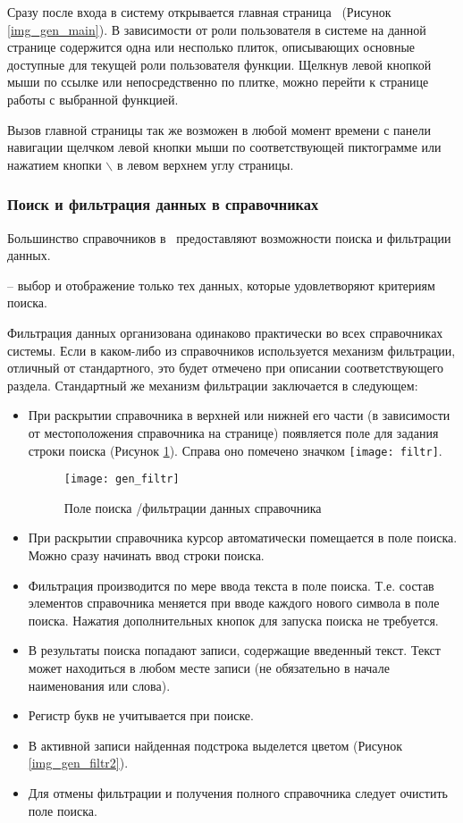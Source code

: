 Сразу после входа в систему открывается главная страница \tmis~(Рисунок \ref{img_gen_main}). В зависимости от роли пользователя в системе на данной странице содержится одна или несполько плиток, описывающих основные доступные для текущей роли пользователя функции. Щелкнув левой кнопкой мыши по ссылке  или непосредственно по плитке, можно перейти к странице работы с выбранной функцией. 

Вызов главной страницы так же возможен в любой момент времени с панели навигации щелчком левой кнопки мыши по соответствующей пиктограмме или нажатием кнопки  $\backslash$  в левом верхнем углу страницы.


\subsubsection{Поиск и фильтрация данных в справочниках} \label{gen_filtr}

Большинство справочников в \tmis~предоставляют возможности поиска и фильтрации данных.

 -- выбор и отображение только тех данных, которые удовлетворяют критериям поиска.

Фильтрация данных организована одинаково практически во всех справочниках системы. Если в каком-либо из справочников используется механизм фильтрации, отличный от стандартного, это будет отмечено при описании соответствующего раздела. Стандартный же механизм фильтрации заключается в следующем:
\begin{itemize}
 \item При раскрытии справочника в верхней или нижней его части (в зависимости от местоположения справочника на странице) появляется поле для задания строки поиска (Рисунок \ref{img_gen_filtr}). Справа оно помечено значком \texttt{[image: filtr]}.
 
 \begin{figure}[!ht]\centering
 	\texttt{[image: gen\_filtr]}
 	\caption{Поле поиска \slash фильтрации данных справочника}
 	\label{img_gen_filtr}
 \end{figure} 
 
 \item При раскрытии справочника курсор автоматически помещается в поле поиска. Можно сразу начинать ввод строки поиска.
 \item Фильтрация производится по мере ввода текста в поле поиска. Т.е. состав элементов справочника меняется при вводе каждого нового символа в поле поиска. Нажатия дополнительных кнопок для запуска поиска не требуется.
 \item В результаты поиска попадают записи, содержащие введенный текст. Текст может находиться в любом месте записи (не обязательно в начале наименования или слова).
 \item Регистр букв не учитывается при поиске.
 \item В активной записи найденная подстрока выделется цветом (Рисунок \ref{img_gen_filtr2}).
 \item Для отмены фильтрации и получения полного справочника следует очистить поле поиска.
\end{itemize} 

